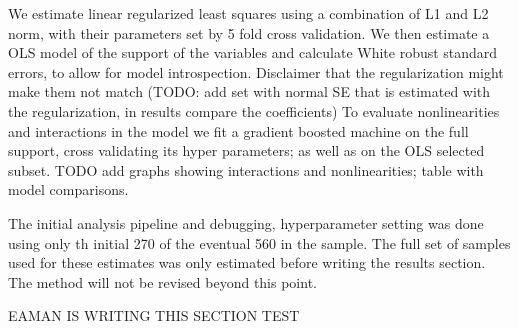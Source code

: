 We estimate linear regularized least squares using a combination of L1 and L2 norm, with their parameters set by 5 fold cross validation. 
We then estimate a OLS model of the support of the variables and calculate White robust standard errors, to allow for model introspection. 
Disclaimer that the regularization might make them not match (TODO: add set with normal SE that is estimated with the regularization, in results compare the coefficients) 
To evaluate nonlinearities and interactions  in the model we fit a gradient boosted machine on the full support, cross validating its hyper parameters; as well as on the OLS selected subset.  TODO add graphs showing interactions and nonlinearities; table with model comparisons.


The initial analysis pipeline and debugging, hyperparameter setting was done using only th initial 270 of the eventual 560 in the sample. The full set of samples used for these estimates was only estimated before writing the results section. The method will not be revised beyond this point.

EAMAN IS WRITING THIS SECTION
TEST

